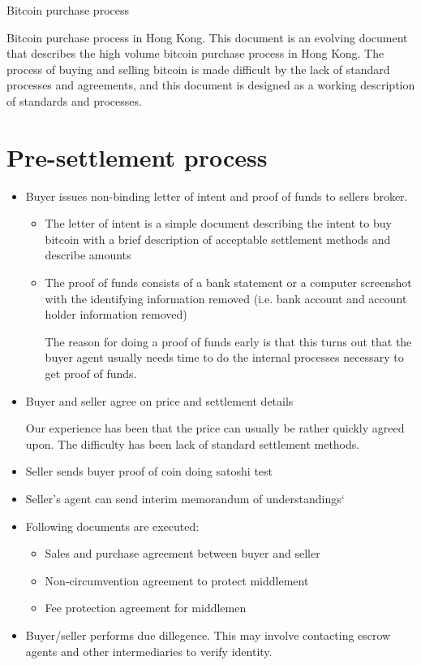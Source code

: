 \documentclass[10pt]{article}
\begin{document}
\begin{center}
{\Large Bitcoin purchase process}
\end{center}

Bitcoin purchase process in Hong Kong.  This document is an evolving
document that describes the high volume bitcoin purchase process in
Hong Kong.  The process of buying and selling bitcoin is made
difficult by the lack of standard processes and agreements, and this
document is designed as a working description of standards and
processes.

\section{Pre-settlement process}

\begin{itemize}
\item Buyer issues non-binding letter of intent and proof of funds to
sellers broker.

\begin{itemize}
\item The letter of intent is a simple document describing the intent
  to buy bitcoin with a brief description of acceptable settlement
  methods and describe amounts
  
\item The proof of funds consists of a bank statement or a computer
screenshot with the identifying information removed (i.e. bank account
and account holder information removed)

The reason for doing a proof of funds early is that this turns out
that the buyer agent usually needs time to do the internal processes
necessary to get proof of funds.  
\end{itemize}

\item Buyer and seller agree on price and settlement details

Our experience has been that the price can usually be rather quickly
agreed upon.  The difficulty has been lack of standard settlement
methods.

\item Seller sends buyer proof of coin doing satoshi test

\item Seller's agent can send interim memorandum of understandings`

\item Following documents are executed:

\begin{itemize}
\item Sales and purchase agreement between buyer and seller
\item Non-circumvention agreement to protect middlement
\item Fee protection agreement for middlemen
\end{itemize}

\item Buyer/seller performs due dillegence.  This may involve
  contacting escrow agents and other intermediaries to verify
  identity.
\end{itemize}
  
\end{document}

